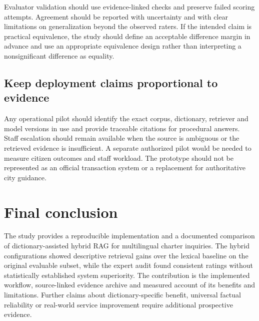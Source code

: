 Evaluator validation should use evidence-linked checks and preserve failed scoring attempts. Agreement should be reported with uncertainty and with clear limitations on generalization beyond the observed raters. If the intended claim is practical equivalence, the study should define an acceptable difference margin in advance and use an appropriate equivalence design rather than interpreting a nonsignificant difference as equality.


\subsection{Keep deployment claims proportional to evidence}

Any operational pilot should identify the exact corpus, dictionary, retriever and model versions in use and provide traceable citations for procedural answers. Staff escalation should remain available when the source is ambiguous or the retrieved evidence is insufficient. A separate authorized pilot would be needed to measure citizen outcomes and staff workload. The prototype should not be represented as an official transaction system or a replacement for authoritative city guidance.


\section{Final conclusion}

The study provides a reproducible implementation and a documented comparison of dictionary-assisted hybrid RAG for multilingual charter inquiries. The hybrid configurations showed descriptive retrieval gains over the lexical baseline on the original evaluable subset, while the expert audit found consistent ratings without statistically established system superiority. The contribution is the implemented workflow, source-linked evidence archive and measured account of its benefits and limitations. Further claims about dictionary-specific benefit, universal factual reliability or real-world service improvement require additional prospective evidence.
